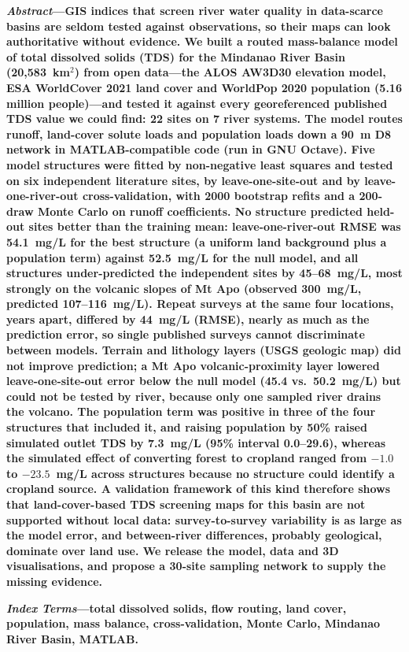 \documentclass[10pt,twocolumn,letterpaper]{article}
\begin{document}
\noindent\textbf{\textit{Abstract}---GIS indices that screen river water quality in data-scarce basins are seldom tested against observations, so their maps can look authoritative without evidence. We built a routed mass-balance model of total dissolved solids (TDS) for the Mindanao River Basin (20,583~km$^2$) from open data---the ALOS AW3D30 elevation model, ESA WorldCover 2021 land cover and WorldPop 2020 population (5.16 million people)---and tested it against every georeferenced published TDS value we could find: 22 sites on 7 river systems. The model routes runoff, land-cover solute loads and population loads down a 90~m D8 network in MATLAB-compatible code (run in GNU Octave). Five model structures were fitted by non-negative least squares and tested on six independent literature sites, by leave-one-site-out and by leave-one-river-out cross-validation, with 2000 bootstrap refits and a 200-draw Monte Carlo on runoff coefficients. No structure predicted held-out sites better than the training mean: leave-one-river-out RMSE was 54.1~mg/L for the best structure (a uniform land background plus a population term) against 52.5~mg/L for the null model, and all structures under-predicted the independent sites by 45--68~mg/L, most strongly on the volcanic slopes of Mt Apo (observed 300~mg/L, predicted 107--116~mg/L). Repeat surveys at the same four locations, years apart, differed by 44~mg/L (RMSE), nearly as much as the prediction error, so single published surveys cannot discriminate between models. Terrain and lithology layers (USGS geologic map) did not improve prediction; a Mt Apo volcanic-proximity layer lowered leave-one-site-out error below the null model (45.4 vs.\ 50.2~mg/L) but could not be tested by river, because only one sampled river drains the volcano. The population term was positive in three of the four structures that included it, and raising population by 50\% raised simulated outlet TDS by 7.3~mg/L (95\% interval 0.0--29.6), whereas the simulated effect of converting forest to cropland ranged from $-1.0$ to $-23.5$~mg/L across structures because no structure could identify a cropland source. A validation framework of this kind therefore shows that land-cover-based TDS screening maps for this basin are not supported without local data: survey-to-survey variability is as large as the model error, and between-river differences, probably geological, dominate over land use. We release the model, data and 3D visualisations, and propose a 30-site sampling network to supply the missing evidence.}

\vspace{4pt}
\noindent\textbf{\textit{Index Terms}---total dissolved solids, flow routing, land cover, population, mass balance, cross-validation, Monte Carlo, Mindanao River Basin, MATLAB.}
\end{document}
